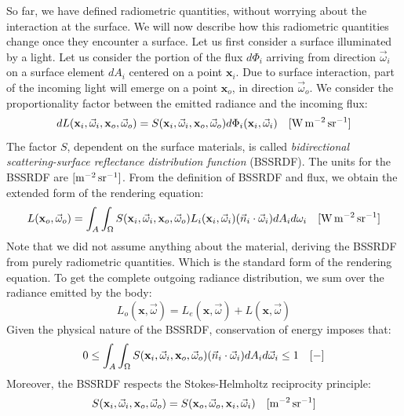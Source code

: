 So far, we have defined radiometric quantities, without worrying about the interaction at the surface. We will now describe how this radiometric quantities change once they encounter a surface. Let us first consider a surface illuminated by a light. Let us consider the portion of the flux $d \Phi_i$ arriving from direction $\vec{\omega}_i$ on a surface element $d A_i$ centered on a point $\mathbf{x}_i$. Due to surface interaction, part of the incoming light will emerge on a point $\mathbf{x}_o$, in direction $\vec{\omega}_o$. We consider the proportionality factor between the emitted radiance and the incoming flux:
\begin{equation}
\label{eq:bssrdf}
d L(\mathbf{x}_i, \vec{\omega}_i, \mathbf{x}_o, \vec{\omega}_o) = S(\mathbf{x}_i, \vec{\omega}_i, \mathbf{x}_o, \vec{\omega}_o) d \Phi_i(\mathbf{x}_i, \vec{\omega}_i)  \siunit{\watt \per \square \metre \per \steradian}
\end{equation}
The factor $S$, dependent on the surface materials, is called \emph{bidirectional scattering-surface reflectance distribution function} (BSSRDF). The units for the BSSRDF are $\siunitnospace{\per \square \metre \per \steradian}$. From the definition of BSSRDF and flux, we obtain the extended form of the rendering equation:
\begin{equation}
\label{eq:bssrdfintegral}
L(\mathbf{x}_o, \vec{\omega}_o) = \int_A \int_\Omega S(\mathbf{x}_i, \vec{\omega}_i, \mathbf{x}_o, \vec{\omega}_o) L_i(\mathbf{x}_i, \vec{\omega}_i) (\vec{n}_i \cdot \vec{\omega}_i) d A_i d {\omega}_i  \siunit{\watt \per \square \metre \per \steradian}
\end{equation}
Note that we did not assume anything about the material, deriving the BSSRDF from purely radiometric quantities. 
Which is the standard form of the rendering equation. To get the complete outgoing radiance distribution, we sum over the radiance emitted by the body:
\begin{equation*}
L_o(\mathbf{x}, \vec{\omega}) = L_e(\mathbf{x}, \vec{\omega}) + L(\mathbf{x}, \vec{\omega}) 
\end{equation*}
Given the physical nature of the BSSRDF, conservation of energy imposes that:
\begin{equation}
\label{eq:bssrdfconservation}
0 \leq \int_A \int_\Omega S(\mathbf{x}_i, \vec{\omega}_i, \mathbf{x}_o, \vec{\omega}_o) (\vec{n}_i \cdot \vec{\omega}_i) d A_i d \vec{\omega}_i \leq 1 \ \ \ [\SI{}{-}]
\end{equation}
Moreover, the BSSRDF respects the Stokes-Helmholtz reciprocity principle:
\begin{equation}
\label{eq:bssrdfreciprocity}
S(\mathbf{x}_i, \vec{\omega}_i, \mathbf{x}_o, \vec{\omega}_o) = 
S(\mathbf{x}_o, \vec{\omega}_o, \mathbf{x}_i, \vec{\omega}_i)  \siunit{\per \square \metre \per \steradian}
\end{equation}

